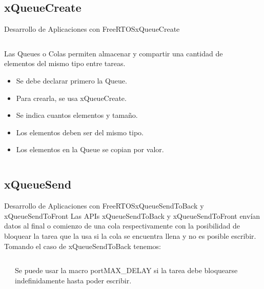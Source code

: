 \documentclass[aspectratio=169, xcolor=dvipsnames]{beamer}
\begin{document}
\subsection{xQueueCreate}
\begin{frame}{Desarrollo de Aplicaciones con FreeRTOS}{xQueueCreate}
\begin{columns}
\begin{column}{0.5\textwidth}
Las Queues o Colas permiten almacenar y compartir una cantidad de elementos del mismo tipo entre tareas.\newline
\begin{itemize}
    \item Se debe declarar primero la Queue.
    \item Para crearla, se usa \textcolor{myblue}{xQueueCreate}.
    \item Se indica cuantos elementos y tamaño.
    \item Los elementos deben ser del mismo tipo.
    \item Los elementos en la Queue se copian por valor.
\end{itemize}
\end{column}
\begin{column}{0.5\textwidth}

\end{column}
\end{columns}
\end{frame}

\subsection{xQueueSend}
\begin{frame}{Desarrollo de Aplicaciones con FreeRTOS}{xQueueSendToBack y xQueueSendToFront}
Las APIs \textcolor{myblue}{xQueueSendToBack} y \textcolor{myblue}{xQueueSendToFront} envían datos al final o comienzo de una cola respectivamente con la posibilidad de bloquear la tarea que la usa si la cola se encuentra llena y no es posible escribir. Tomando el caso de xQueueSendToBack tenemos:\newline
\begin{columns}
\begin{column}{0.5\textwidth}

\end{column}
\begin{column}{0.5\textwidth}
Se puede usar la macro \textcolor{myblue}{portMAX\_DELAY} si la tarea debe bloquearse indefinidamente hasta poder escribir.
\end{column}
\end{columns}
\end{frame}
\end{document}
